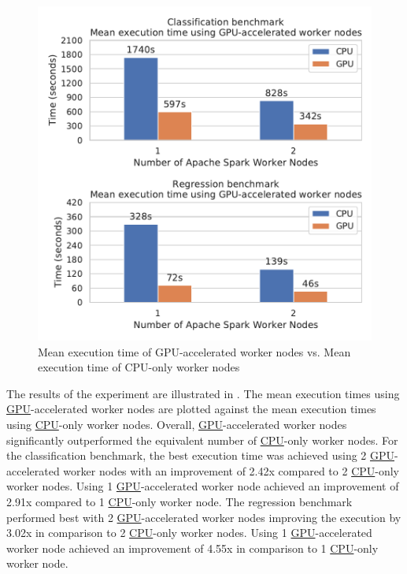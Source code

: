 \begin{figure}[h]
\centering
\includegraphics[scale=0.9]{images/07_evaluation/overall_cpu_vs_gpu}
\caption{Mean execution time of GPU-accelerated worker nodes vs. Mean execution time of CPU-only worker nodes}
\label{fig:07_gpu_results}
\end{figure}
The results of the experiment are illustrated in .
The mean execution times using \hyperlink{abbr:gpu}{GPU}-accelerated worker nodes are plotted against the mean execution times using \hyperlink{abbr:cpu}{CPU}-only worker nodes.
Overall, \hyperlink{abbr:gpu}{GPU}-accelerated worker nodes significantly outperformed the equivalent number of \hyperlink{abbr:cpu}{CPU}-only worker nodes.
For the classification benchmark, the best execution time was achieved using 2 \hyperlink{abbr:gpu}{GPU}-accelerated worker nodes with an improvement of 2.42x compared to 2 \hyperlink{abbr:cpu}{CPU}-only worker nodes. Using 1 \hyperlink{abbr:gpu}{GPU}-accelerated worker node achieved an improvement of 2.91x compared to 1 \hyperlink{abbr:cpu}{CPU}-only worker node.
The regression benchmark performed best with 2 \hyperlink{abbr:gpu}{GPU}-accelerated worker nodes improving the execution by 3.02x in comparison to 2 \hyperlink{abbr:cpu}{CPU}-only worker nodes. Using 1 \hyperlink{abbr:gpu}{GPU}-accelerated worker node achieved an improvement of 4.55x in comparison to 1 \hyperlink{abbr:cpu}{CPU}-only worker node.

